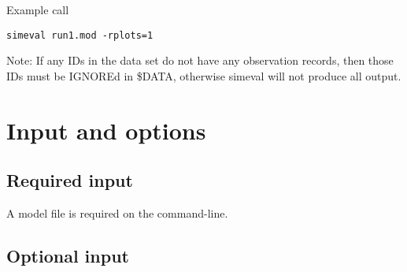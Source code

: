 Example call
\begin{verbatim}
simeval run1.mod -rplots=1
\end{verbatim}
Note: If any IDs in the data set do not have any observation records, then those IDs must be
IGNOREd in \$DATA, otherwise simeval will not produce all output.

\section{Input and options}

\subsection{Required input}

A model file is required on the command-line.

\subsection{Optional input}

